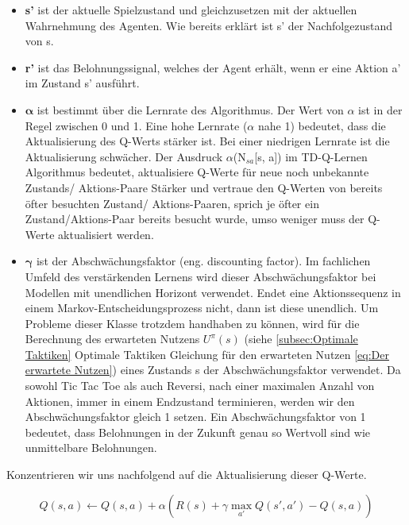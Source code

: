 \begin{itemize}
\item \textbf{s'} ist der aktuelle Spielzustand und gleichzusetzen mit der aktuellen Wahrnehmung des Agenten. Wie bereits erklärt ist s' der Nachfolgezustand von s.

\item \textbf{r'} ist das Belohnungssignal, welches der Agent erhält, wenn er eine Aktion a' im Zustand s' ausführt. 

\item $\boldsymbol{\alpha}$ ist bestimmt über die Lernrate des Algorithmus. Der Wert von $\alpha$ ist in der Regel zwischen 0 und 1. Eine hohe Lernrate ($\alpha$ nahe 1) bedeutet, dass die Aktualisierung des Q-Werts stärker ist. Bei einer niedrigen Lernrate ist die Aktualisierung schwächer. Der Ausdruck $\alpha$(N$_{sa}$[s, a]) im TD-Q-Lernen Algorithmus bedeutet, aktualisiere Q-Werte für neue noch unbekannte Zustands/ Aktions-Paare Stärker und vertraue den Q-Werten von bereits öfter besuchten Zustand/ Aktions-Paaren, sprich je öfter ein Zustand/Aktions-Paar bereits besucht wurde, umso weniger muss der Q-Werte aktualisiert werden.

\item $\boldsymbol{\gamma}$ ist der Abschwächungsfaktor (eng. discounting factor). Im fachlichen Umfeld des verstärkenden Lernens wird dieser Abschwächungsfaktor bei Modellen mit unendlichen Horizont verwendet. Endet eine Aktionssequenz in einem Markov-Entscheidungsprozess nicht, dann ist diese unendlich. Um Probleme dieser Klasse trotzdem handhaben zu können, wird für die Berechnung des erwarteten Nutzens $U^\pi(s)$ (siehe \ref{subsec:Optimale Taktiken} Optimale Taktiken Gleichung für den erwarteten Nutzen \ref{eq:Der erwartete Nutzen}) eines Zustands s der Abschwächungsfaktor verwendet. Da sowohl Tic Tac Toe als auch Reversi, nach einer maximalen Anzahl von Aktionen, immer in einem Endzustand terminieren, werden wir den Abschwächungsfaktor gleich 1 setzen. Ein Abschwächungsfaktor von 1 bedeutet, dass Belohnungen in der Zukunft genau so Wertvoll sind wie unmittelbare Belohnungen. 
\end{itemize} 

Konzentrieren wir uns nachfolgend auf die Aktualisierung dieser Q-Werte.

\begin{equation} \label{eq:TD-Q-Aktualisierungsgleichung}
Q(s,a) \leftarrow Q(s,a) + \alpha(R(s) + \gamma \max_{a'} Q(s', a') - Q(s,a))
\end{equation}